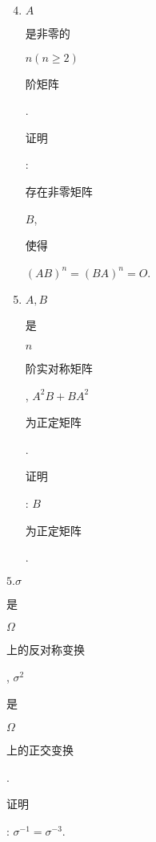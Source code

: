 \documentclass[10pt]{article}
\begin{document}
\begin{enumerate}
  \setcounter{enumi}{3}
  \item $A$ \begin{CJK}{UTF8}{mj}是非零的\end{CJK} $n(n \geq 2)$ \begin{CJK}{UTF8}{mj}阶矩阵\end{CJK}. \begin{CJK}{UTF8}{mj}证明\end{CJK}: \begin{CJK}{UTF8}{mj}存在非零矩阵\end{CJK} $B$, \begin{CJK}{UTF8}{mj}使得\end{CJK} $(A B)^{n}=(B A)^{n}=O$.

  \item $A, B$ \begin{CJK}{UTF8}{mj}是\end{CJK} $n$ \begin{CJK}{UTF8}{mj}阶实对称矩阵\end{CJK}, $A^{2} B+B A^{2}$ \begin{CJK}{UTF8}{mj}为正定矩阵\end{CJK}. \begin{CJK}{UTF8}{mj}证明\end{CJK}: $B$ \begin{CJK}{UTF8}{mj}为正定矩阵\end{CJK}.

\end{enumerate}
$5 . \sigma$ \begin{CJK}{UTF8}{mj}是\end{CJK} $\Omega$ \begin{CJK}{UTF8}{mj}上的反对称变换\end{CJK}, $\sigma^{2}$ \begin{CJK}{UTF8}{mj}是\end{CJK} $\Omega$ \begin{CJK}{UTF8}{mj}上的正交变换\end{CJK}. \begin{CJK}{UTF8}{mj}证明\end{CJK}: $\sigma^{-1}=\sigma^{-3}$.
\end{document}
